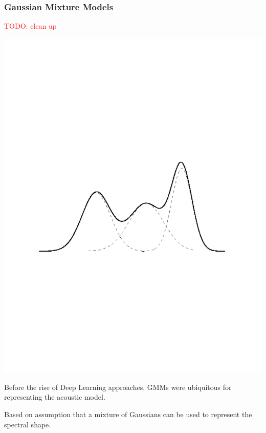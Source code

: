 \documentclass[notes]{beamer}
\newcommand{\TODO}[1]{\textcolor{red}{TODO: #1}}
\begin{document}
\begin{frame}
	\frametitle{Gaussian Mixture Models}\TODO{clean up}
	\begin{center}
		\includegraphics[scale=.3, clip=true, trim=5cm 9cm 4cm 10cm]{gmm.pdf}
	\end{center}

	\begin{center}
		Before the rise of Deep Learning approaches, GMMs were ubiquitous for representing the acoustic model.
	\end{center}
	\begin{center}
		Based on assumption that a mixture of Gaussians can be used to represent the spectral shape.
	\end{center}	

\end{frame}
\end{document}
